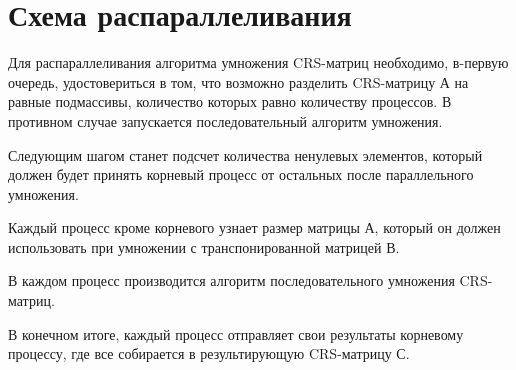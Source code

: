 \documentclass{report}
\begin{document}
\section*{Схема распараллеливания}
Для распараллеливания алгоритма умножения CRS-матриц необходимо, в-первую очередь, удостовериться в том, что возможно разделить CRS-матрицу А на равные подмассивы, количество которых равно количеству процессов. В противном случае запускается последовательный алгоритм умножения.
\par Следующим шагом станет подсчет количества ненулевых элементов, который должен будет принять корневый процесс от остальных после параллельного умножения. 
\par Каждый процесс кроме корневого узнает размер матрицы А, который он должен использовать при умножении с транспонированной матрицей В.
\par В каждом процесс производится алгоритм последовательного умножения CRS-матриц.
\par В конечном итоге, каждый процесс отправляет свои результаты корневому процессу, где все собирается в результирующую CRS-матрицу С.
\newpage

\end{document}
